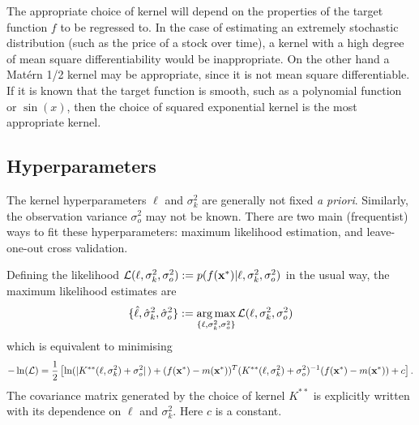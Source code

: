 The appropriate choice of kernel will depend on the properties of the
target function $f$ to be regressed to. In the case of estimating an extremely
stochastic distribution (such as the price of a stock over time), a
kernel with a high degree of mean square differentiability would be
inappropriate. On the other hand a Mat\'ern 1/2 kernel may be appropriate,
since it is not mean square differentiable. If it is known that the target
function is smooth, such as a polynomial function or $\sin(x)$,
then the choice of squared
exponential kernel is the most appropriate kernel.

\subsection*{Hyperparameters}

The kernel hyperparameters $\ell$ and $\sigma^2_k$ are generally not fixed
\emph{a priori}. Similarly, the observation variance $\sigma^2_o$
may not be known.
There are two main (frequentist) ways to fit these hyperparameters:
maximum likelihood estimation, and leave-one-out cross validation.

Defining the likelihood
$
    \mathcal{L}(\ell, \sigma^2_k, \sigma^2_o)
    := p(f(\mathbf{x}^\ast) | \ell, \sigma^2_k, \sigma^2_o)
$ in the usual way,
the maximum likelihood estimates are
\begin{align}
    \{\hat{\ell}, \hat{\sigma}^2_k, \hat{\sigma}^2_o\} :=
    \operatorname*{arg\,max}_{\{\ell, \sigma^2_k, \sigma^2_o\}}
    \mathcal{L}(\ell, \sigma^2_k, \sigma^2_o)
    \label{eq:MLE_GP}
\end{align}
which is equivalent to minimising
$$
    -\ln(\mathcal{L}) =\frac{1}{2} \left[
    \ln (|K^{**}(\ell, \sigma^2_k) + \sigma^2_o|\,)
    + (f(\mathbf{x}^\ast) - m(\mathbf{x}^\ast))^T
    (K^{**}(\ell, \sigma^2_k) + \sigma^2_o)^{-1}
    (f(\mathbf{x}^\ast) - m(\mathbf{x}^\ast)) + c
    \right].
$$
The covariance matrix generated by the choice of kernel $K^{**}$ is
explicitly written with its dependence on $\ell$ and $\sigma^2_k.$ Here $c$ is a
constant.

